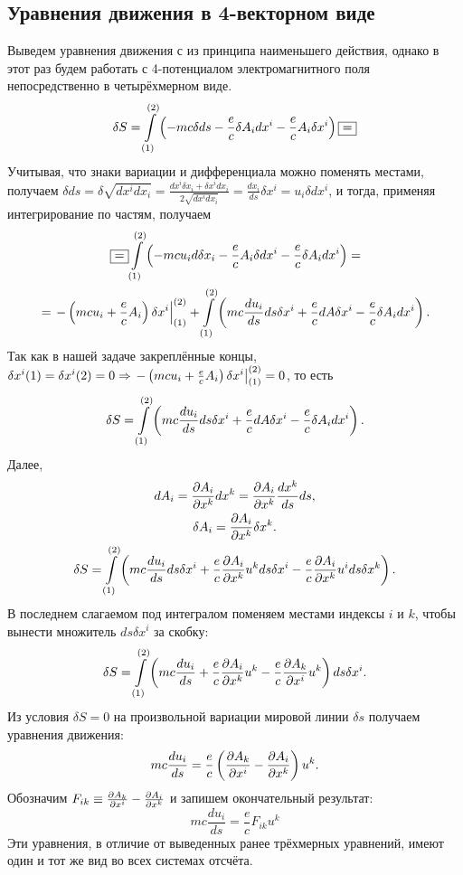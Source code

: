 \subsection{Уравнения движения в 4-векторном виде}
    Выведем уравнения движения с из принципа наименьшего действия, однако в этот раз будем работать с 4-потенциалом электромагнитного поля непосредственно в
    четырёхмерном виде.
    \[
        \delta S = \int\limits_{(1)}^{(2)} \left({-mc\delta ds - \frac{e}{c}\delta A_idx^i - \frac{e}{c}A_i\delta x^i}\right) \boxed{=}
    \]
        Учитывая, что знаки вариации и дифференциала можно поменять местами, получаем $ \displaystyle \delta ds = \delta\sqrt{dx^idx_i} = \frac{dx^i\delta x_i + \delta x^idx_i}{2\sqrt{dx^idx_i}} = \frac{dx_i}{ds}\delta x^i = u_i\delta dx^i$,
        и тогда, применяя интегрирование по частям, получаем
    \begin{gather*}
        \boxed{=} \int\limits_{(1)}^{(2)} \left({-mcu_id\delta x_i - \frac{e}{c} A_i\delta dx^i - \frac{e}{c} \delta A_i dx^i}\right) = \\
        =\left. -\left({mcu_i + \frac{e}{c}A_i}\right)\delta x^i \right|_{(1)}^{(2)} + \int\limits_{(1)}^{(2)}\left({mc\frac{du_i}{ds}ds\delta x^i + \frac ec dA \delta x^i - \frac ec \delta A_i dx^i}\right).
    \end{gather*}
    Так как в нашей задаче закреплённые концы, $\delta x^i(1) = \delta x^i(2) = 0 \Rightarrow \left. -\left({mcu_i + \frac{e}{c}A_i}\right)\delta x^i \right|_{(1)}^{(2)} = 0$, то есть
    \[
        \delta S = \int\limits_{(1)}^{(2)}\left({mc\frac{du_i}{ds}ds\delta x^i + \frac ec dA \delta x^i - \frac ec \delta A_i dx^i}\right).
    \]
    Далее,
    \begin{gather*}
        dA_i = \frac{\partial A_i}{\partial x^k} dx^k = \frac{\partial A_i}{\partial x^k} \frac{dx^k}{ds} ds, \\
        \delta A_i = \frac{\partial A_i}{\partial x^k} \delta x^k. \\
        \delta S = \int\limits_{(1)}^{(2)} \left({mc \frac{du_i}{ds} ds\delta x^i + \frac{e}{c} \frac{\partial A_i}{\partial x^k} u^k ds \delta x^i
        - \frac{e}{c} \frac{\partial A_i}{\partial x^k} u^ids \delta x^k}\right).
    \end{gather*}
    В последнем слагаемом под интегралом поменяем местами индексы $i$ и $k$, чтобы вынести множитель $ds\delta x^i$ за скобку:
    \[
        \delta S = \int\limits_{(1)}^{(2)} \left({mc \frac{du_i}{ds} + \frac{e}{c} \frac{\partial A_i}{\partial x^k}u^k - \frac ec \frac{\partial A_k}{\partial x^i} u^k}\right)ds\delta x^i.
    \]
    Из условия $\delta S = 0$ на произвольной вариации мировой линии $\delta s$ получаем уравнения движения:
    \[
        mc\frac{du_i}{ds} = \frac{e}{c}\left({\frac{\partial A_k}{\partial x^i} - \frac{\partial A_i}{\partial x^k}}\right)u^k.
    \]
    Обозначим $F_{ik} \equiv \frac{\partial A_k}{\partial x^i} - \frac{\partial A_i}{\partial x^k}$ и запишем окончательный результат:
    \begin{equation}
        \boxed{mc\frac{du_i}{ds} = \frac{e}{c}F_{ik}u^k} \label{four_motion}
    \end{equation}
    Эти уравнения, в отличие от выведенных ранее трёхмерных уравнений, имеют один и тот же вид во всех системах отсчёта.

